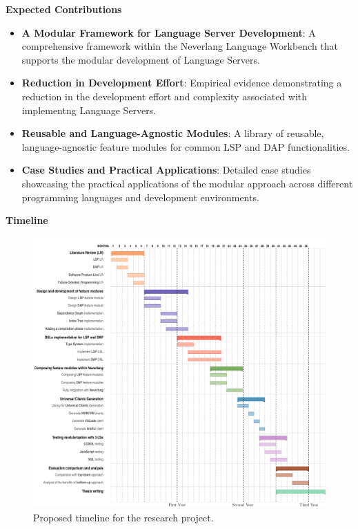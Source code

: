 \hfill \break
\noindent
\textbf{Expected Contributions}

\begin{itemize}
    \item \textbf{A Modular Framework for Language Server Development}: A comprehensive framework within the Neverlang Language Workbench that supports the modular development of Language Servers.
    \item \textbf{Reduction in Development Effort}: Empirical evidence demonstrating a reduction in the development effort and complexity associated with implementng Language Servers.
    \item \textbf{Reusable and Language-Agnostic Modules}: A library of reusable, language-agnostic feature modules for common LSP and DAP functionalities.
    \item \textbf{Case Studies and Practical Applications}: Detailed case studies showcasing the practical applications of the modular approach across different programming languages and development environments.
\end{itemize}


\hfill \break
\noindent
\textbf{Timeline}

\hfill \break
\begin{figure}[t]
    \centering
    \includegraphics[width=.9\linewidth]{figs/gantt.pdf}
    \caption{Proposed timeline for the research project.}
    \label{fig:gantt}
\end{figure}

